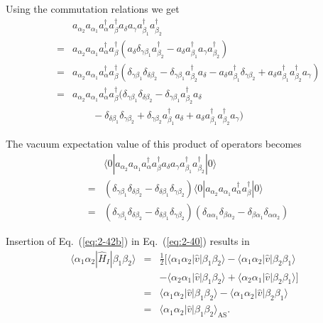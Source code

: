 Using the commutation relations we get 
\begin{align}
	&& a_{\alpha_2} a_{\alpha_1}a^{\dagger}_\alpha a^{\dagger}_\beta 
		a_\delta a_\gamma a_{\beta_1}^{\dagger} a_{\beta_2}^{\dagger} \nonumber \\
	&=& a_{\alpha_2} a_{\alpha_1}a^{\dagger}_\alpha a^{\dagger}_\beta 
		( a_\delta \delta_{\gamma \beta_1} a_{\beta_2}^{\dagger} - 
		a_\delta  a_{\beta_1}^{\dagger} a_\gamma a_{\beta_2}^{\dagger} ) \nonumber \\
	&=& a_{\alpha_2} a_{\alpha_1}a^{\dagger}_\alpha a^{\dagger}_\beta 
		(\delta_{\gamma \beta_1} \delta_{\delta \beta_2} - \delta_{\gamma \beta_1} a_{\beta_2}^{\dagger} a_\delta -
		a_\delta a_{\beta_1}^{\dagger}\delta_{\gamma \beta_2} +
		a_\delta a_{\beta_1}^{\dagger} a_{\beta_2}^{\dagger} a_\gamma ) \nonumber \\
	&=& a_{\alpha_2} a_{\alpha_1}a^{\dagger}_\alpha a^{\dagger}_\beta 
		(\delta_{\gamma \beta_1} \delta_{\delta \beta_2} - \delta_{\gamma \beta_1} a_{\beta_2}^{\dagger} a_\delta \nonumber \\
		&& \qquad - \delta_{\delta \beta_1} \delta_{\gamma \beta_2} + \delta_{\gamma \beta_2} a_{\beta_1}^{\dagger} a_\delta
		+ a_\delta a_{\beta_1}^{\dagger} a_{\beta_2}^{\dagger} a_\gamma ) \label{eq:2-41}
\end{align}

The vacuum expectation value of this product of operators becomes
\begin{align}
	&& \langle 0|a_{\alpha_2} a_{\alpha_1} a^{\dagger}_\alpha a^{\dagger}_\beta a_\delta a_\gamma 
		a_{\beta_1}^{\dagger} a_{\beta_2}^{\dagger}|0\rangle \nonumber \\
	&=& (\delta_{\gamma \beta_1} \delta_{\delta \beta_2} -
		\delta_{\delta \beta_1} \delta_{\gamma \beta_2} ) 
		\langle 0|a_{\alpha_2} a_{\alpha_1}a^{\dagger}_\alpha a^{\dagger}_\beta|0\rangle \nonumber \\
	&=& (\delta_{\gamma \beta_1} \delta_{\delta \beta_2} -\delta_{\delta \beta_1} \delta_{\gamma \beta_2} )
	(\delta_{\alpha \alpha_1} \delta_{\beta \alpha_2} -\delta_{\beta \alpha_1} \delta_{\alpha \alpha_2} ) \label{eq:2-42b}
\end{align}

Insertion of 
Eq.~(\ref{eq:2-42b}) in Eq.~(\ref{eq:2-40}) results in
\begin{align}
	\langle \alpha_1\alpha_2|\hat{H}_I|\beta_1\beta_2\rangle &=& \frac{1}{2} \big[ 
		\langle \alpha_1\alpha_2|\hat{v}|\beta_1\beta_2\rangle- \langle \alpha_1\alpha_2|\hat{v}|\beta_2\beta_1\rangle \nonumber \\
		&& - \langle \alpha_2\alpha_1|\hat{v}|\beta_1\beta_2\rangle + \langle \alpha_2\alpha_1|\hat{v}|\beta_2\beta_1\rangle \big] \nonumber \\
	&=& \langle \alpha_1\alpha_2|\hat{v}|\beta_1\beta_2\rangle - \langle \alpha_1\alpha_2|\hat{v}|\beta_2\beta_1\rangle \nonumber \\
	&=& \langle \alpha_1\alpha_2|\hat{v}|\beta_1\beta_2\rangle_{\mathrm{AS}}. \label{eq:2-43b}
\end{align}

